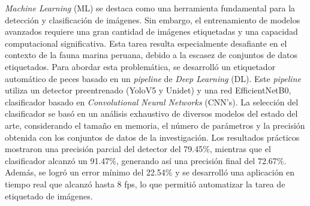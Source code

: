 \textit{Machine Learning} (ML) se destaca como una herramienta 
fundamental para la detección y clasificación de imágenes. 
Sin embargo, el entrenamiento de modelos avanzados requiere 
una gran cantidad de imágenes etiquetadas y una capacidad 
computacional significativa. Esta tarea resulta especialmente 
desafiante en el contexto de la fauna marina peruana, debido 
a la escasez de conjuntos de datos etiquetados. Para abordar esta problemática, 
se desarrolló un etiquetador automático de peces basado en un 
\textit{pipeline} de \textit{Deep Learning} (DL). 
Este \textit{pipeline} utiliza un detector preentrenado (YoloV5 y Unidet) 
y una red EfficientNetB0, clasificador basado en 
\textit{Convolutional Neural Networks} (CNN's). 
La selección del clasificador se basó en un análisis exhaustivo de diversos 
modelos del estado del arte, considerando el tamaño en memoria, 
el número de parámetros y la precisión obtenida con los conjuntos 
de datos de la investigación. Los resultados prácticos mostraron 
una precisión parcial del detector del 79.45\%, mientras que el 
clasificador alcanzó un 91.47\%, generando así una precisión final 
del 72.67\%. Además, se logró un error mínimo del 22.54\% y se 
desarrolló una aplicación en tiempo real que alcanzó hasta 8 fps, 
lo que permitió automatizar la tarea de etiquetado de imágenes.